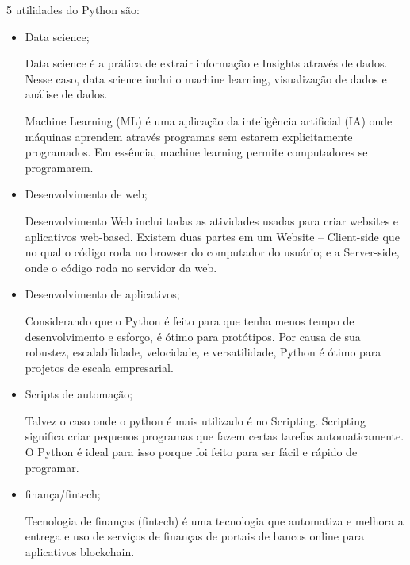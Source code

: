 5 utilidades do Python são:\cite{Python}
\begin{itemize}
\item Data science;

Data science é a prática de extrair informação e Insights através de dados. Nesse caso, data science inclui o machine learning, visualização de dados e análise de dados.

Machine Learning (ML) é uma aplicação da inteligência artificial (IA) onde máquinas aprendem através programas sem estarem explicitamente programados. Em essência, machine learning permite computadores se programarem. 

\item Desenvolvimento de web; 

Desenvolvimento Web inclui todas as atividades usadas para criar websites e aplicativos web-based. Existem duas partes em um Website – Client-side que no qual o código roda no browser do computador do usuário; e a Server-side, onde o código roda no servidor da web.

\item Desenvolvimento de aplicativos;

Considerando que o Python é feito para que tenha menos tempo de desenvolvimento e esforço,  é ótimo para protótipos. Por causa de sua robustez, escalabilidade, velocidade, e versatilidade, Python é ótimo para projetos de escala empresarial.

\item Scripts de automação; 

Talvez o caso onde o python é mais utilizado é no Scripting. Scripting significa criar pequenos programas que fazem certas tarefas automaticamente. O Python é ideal para isso porque foi feito para ser fácil e rápido de programar. 
\item finança/fintech;
 
Tecnologia de finanças (fintech) é uma tecnologia que automatiza e melhora a entrega e uso de serviços de finanças de portais de bancos online para aplicativos blockchain. 
\end{itemize} 
